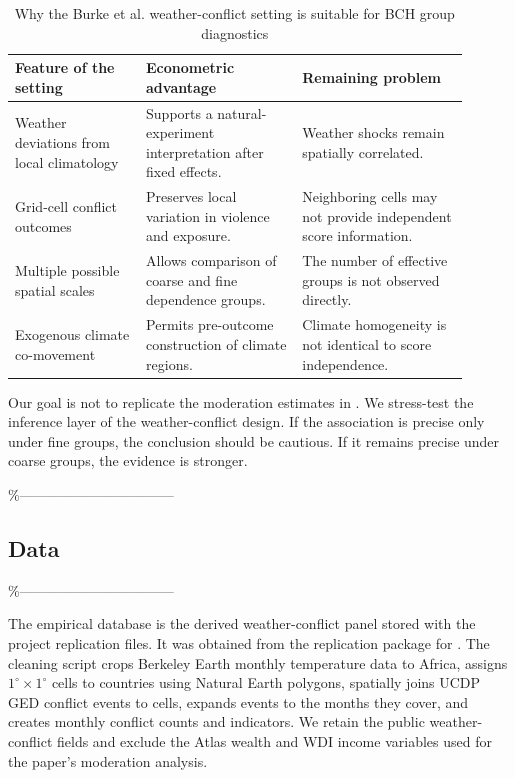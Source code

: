 \documentclass[
]{article}
\begin{document}
\begin{table}[H]
\centering
\caption{Why the Burke et al. weather-conflict setting is suitable for BCH group diagnostics}
\label{tab:hbm-grouping}
\begin{tabular}{p{0.26\linewidth}p{0.31\linewidth}p{0.33\linewidth}}
\toprule
Feature of the setting & Econometric advantage & Remaining problem\\
\midrule
Weather deviations from local climatology & Supports a natural-experiment interpretation after fixed effects. & Weather shocks remain spatially correlated.\\
Grid-cell conflict outcomes & Preserves local variation in violence and exposure. & Neighboring cells may not provide independent score information.\\
Multiple possible spatial scales & Allows comparison of coarse and fine dependence groups. & The number of effective groups is not observed directly.\\
Exogenous climate co-movement & Permits pre-outcome construction of climate regions. & Climate homogeneity is not identical to score independence.\\
\bottomrule
\end{tabular}
\end{table}

Our goal is not to replicate the moderation estimates in
\citet{burke2024}. We stress-test the inference layer of the
weather-conflict design. If the association is precise only under fine
groups, the conclusion should be cautious. If it remains precise under
coarse groups, the evidence is stronger.

\%---------------------------------

\subsection{Data}

\%---------------------------------

The empirical database is the derived weather-conflict panel stored with
the project replication files. It was obtained from the replication
package for \citet{burke2024}. The cleaning script crops Berkeley Earth
monthly temperature data to Africa, assigns \(1^\circ\times1^\circ\)
cells to countries using Natural Earth polygons, spatially joins UCDP
GED conflict events to cells, expands events to the months they cover,
and creates monthly conflict counts and indicators. We retain the public
weather-conflict fields and exclude the Atlas wealth and WDI income
variables used for the paper's moderation analysis.
\end{document}
